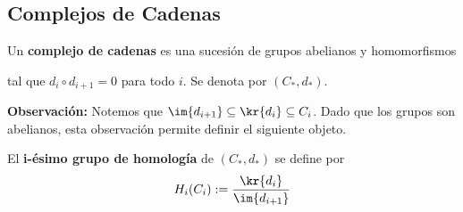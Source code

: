 \documentclass{article}
\begin{document}
\subsection{Complejos de Cadenas}
\begin{dfn}
    Un \textbf{complejo de cadenas} es una sucesión de grupos abelianos y homomorfismos
    
    \vspace{2mm}
    \centerline{
    }
    \vspace{2mm}
    \noindent tal que $d_{i}\circ d_{i+1}=0$ para todo $i$. Se denota por $(C_{*},d_{*})$.
\end{dfn}
\noindent\textbf{Observación:} Notemos que $\im{d_{i+1}}\subseteq\kr{d_{i}}\subseteq C_{i}$. Dado 
que los grupos son abelianos, esta observación permite definir el siguiente objeto.

\vspace{2mm}
\begin{dfn}
    El \textbf{i-ésimo grupo de homología} de $(C_{*},d_{*})$ se define por
    \begin{equation*}
        H_{i}(C_{i}):=\frac{\kr{d_{i}}}{\im{d_{i+1}}}
    \end{equation*}
\end{dfn}
\end{document}
